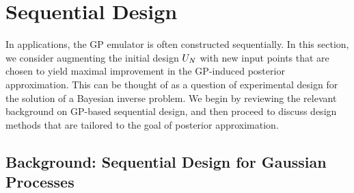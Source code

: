 \documentclass[12pt]{article}
\begin{document}
\section{Sequential Design} \label{seq_des}
In applications, the GP emulator is often constructed sequentially. In this section, we consider augmenting the 
initial design $\designIn[\Ndesign]$ with new input points that are chosen to yield maximal improvement in the 
GP-induced posterior approximation. This can be thought of as a question of experimental design for the 
solution of a Bayesian inverse problem. We begin by reviewing the relevant background on GP-based 
sequential design, and then proceed to discuss design methods that are tailored to the goal of 
posterior approximation.  

\subsection{Background: Sequential Design for Gaussian Processes}
\end{document}
